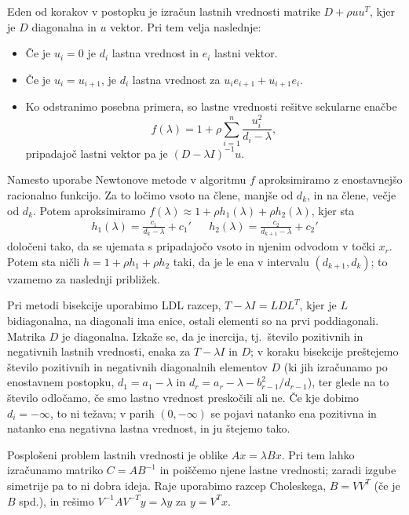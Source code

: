Eden od korakov v postopku je izračun lastnih vrednosti matrike $D + \rho u
u^T$, kjer je $D$ diagonalna in $u$ vektor.
Pri tem velja naslednje:
\begin{itemize}
\item Če je $u_i = 0$ je $d_i$ lastna vrednost in $e_i$ lastni vektor.
\item Če je $u_i = u_{i+1}$, je $d_i$ lastna vrednost za $u_i e_{i+1} + u_{i+1}
  e_i$.
\item Ko odstranimo posebna primera, so lastne vrednosti rešitve sekularne
  enačbe
  \[
	f(\lambda) = 1 + \rho \sum_{i=1}^n \frac{u_i^2}{d_i - \lambda},
  \]
  pripadajoč lastni vektor pa je $(D - \lambda I)^{-1} u$.
\end{itemize}
Namesto uporabe Newtonove metode v algoritmu $f$ aproksimiramo z enostavnejšo
racionalno funkcijo.
Za to ločimo vsoto na člene, manjše od $d_k$, in na člene, večje od $d_k$.
Potem aproksimiramo $f(\lambda) \approx 1 + \rho h_1(\lambda) + \rho
h_2(\lambda)$, kjer sta
\begin{align*}
  h_1(\lambda) = \frac{c_1}{d_k - \lambda} + c_1'
  && h_2(\lambda) = \frac{c_2}{d_{k+1} - \lambda} + c_2'
\end{align*}
določeni tako, da se ujemata s pripadajočo vsoto in njenim odvodom v točki
$x_r$.
Potem sta ničli $h = 1 + \rho h_1 + \rho h_2$ taki, da je le ena v intervalu
$(d_{k+1}, d_k)$; to vzamemo za naslednji približek.


Pri metodi bisekcije uporabimo LDL razcep, $T - \lambda I = L D L^T$, kjer je
$L$ bidiagonalna, na diagonali ima enice, ostali elementi so na prvi
poddiagonali.
Matrika $D$ je diagonalna.
Izkaže se, da je inercija, tj.~število pozitivnih in negativnih lastnih
vrednosti, enaka za $T - \lambda I$ in $D$; v koraku bisekcije preštejemo
število pozitivnih in negativnih diagonalnih elementov $D$ (ki jih izračunamo po
enostavnem postopku, $d_1 = a_1 - \lambda$ in $d_r = a_r - \lambda - b_{r-1}^2 /
d_{r-1}$), ter glede na to število odločamo, če smo lastno vrednost preskočili
ali ne.
Če kje dobimo $d_i = -\infty$, to ni težava; v parih $(0, -\infty)$ se pojavi
natanko ena pozitivna in natanko ena negativna lastna vrednost, in ju štejemo
tako.


Posplošeni problem lastnih vrednosti je oblike $Ax = \lambda B x$.
Pri tem lahko izračunamo matriko $C = A B^{-1}$ in poiščemo njene lastne
vrednosti; zaradi izgube simetrije pa to ni dobra ideja.
Raje uporabimo razcep Choleskega, $B = V V^T$ (če je $B$ spd.), in rešimo
$V^{-1} A V^{-T}y = \lambda y$ za $y = V^T x$.

